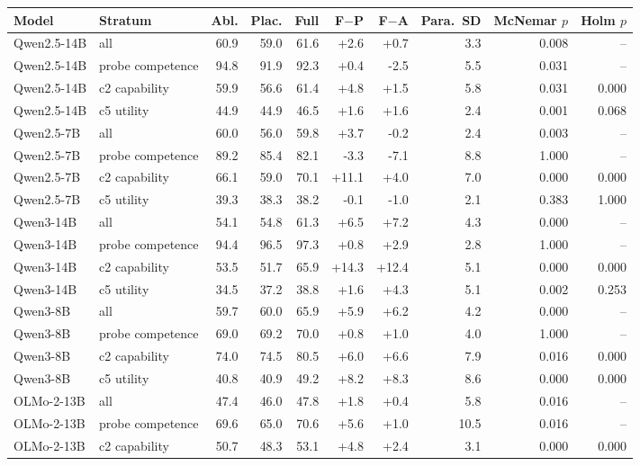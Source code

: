 \begin{table}[t]
\centering\scriptsize
\setlength{\tabcolsep}{3pt}
\begin{tabular}{@{}llrrrrrrrr@{}}
\toprule
Model & Stratum & Abl. & Plac. & Full & F$-$P & F$-$A & Para.\ SD & McNemar $p$ & Holm $p$ \\
\midrule
Qwen2.5-14B & all & 60.9 & 59.0 & 61.6 & +2.6 & +0.7 & 3.3 & 0.008 & -- \\
Qwen2.5-14B & probe competence & 94.8 & 91.9 & 92.3 & +0.4 & -2.5 & 5.5 & 0.031 & -- \\
Qwen2.5-14B & c2 capability & 59.9 & 56.6 & 61.4 & +4.8 & +1.5 & 5.8 & 0.031 & 0.000 \\
Qwen2.5-14B & c5 utility & 44.9 & 44.9 & 46.5 & +1.6 & +1.6 & 2.4 & 0.001 & 0.068 \\
Qwen2.5-7B & all & 60.0 & 56.0 & 59.8 & +3.7 & -0.2 & 2.4 & 0.003 & -- \\
Qwen2.5-7B & probe competence & 89.2 & 85.4 & 82.1 & -3.3 & -7.1 & 8.8 & 1.000 & -- \\
Qwen2.5-7B & c2 capability & 66.1 & 59.0 & 70.1 & +11.1 & +4.0 & 7.0 & 0.000 & 0.000 \\
Qwen2.5-7B & c5 utility & 39.3 & 38.3 & 38.2 & -0.1 & -1.0 & 2.1 & 0.383 & 1.000 \\
Qwen3-14B & all & 54.1 & 54.8 & 61.3 & +6.5 & +7.2 & 4.3 & 0.000 & -- \\
Qwen3-14B & probe competence & 94.4 & 96.5 & 97.3 & +0.8 & +2.9 & 2.8 & 1.000 & -- \\
Qwen3-14B & c2 capability & 53.5 & 51.7 & 65.9 & +14.3 & +12.4 & 5.1 & 0.000 & 0.000 \\
Qwen3-14B & c5 utility & 34.5 & 37.2 & 38.8 & +1.6 & +4.3 & 5.1 & 0.002 & 0.253 \\
Qwen3-8B & all & 59.7 & 60.0 & 65.9 & +5.9 & +6.2 & 4.2 & 0.000 & -- \\
Qwen3-8B & probe competence & 69.0 & 69.2 & 70.0 & +0.8 & +1.0 & 4.0 & 1.000 & -- \\
Qwen3-8B & c2 capability & 74.0 & 74.5 & 80.5 & +6.0 & +6.6 & 7.9 & 0.016 & 0.000 \\
Qwen3-8B & c5 utility & 40.8 & 40.9 & 49.2 & +8.2 & +8.3 & 8.6 & 0.000 & 0.000 \\
OLMo-2-13B & all & 47.4 & 46.0 & 47.8 & +1.8 & +0.4 & 5.8 & 0.016 & -- \\
OLMo-2-13B & probe competence & 69.6 & 65.0 & 70.6 & +5.6 & +1.0 & 10.5 & 0.016 & -- \\
OLMo-2-13B & c2 capability & 50.7 & 48.3 & 53.1 & +4.8 & +2.4 & 3.1 & 0.000 & 0.000 \\

\end{tabular}
\end{table}
